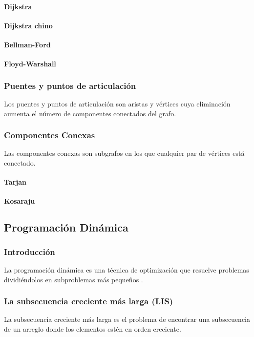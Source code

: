 \paragraph{Dijkstra}
\paragraph{Dijkstra chino}
\paragraph{Bellman-Ford}
\paragraph{Floyd-Warshall}
\subsubsection{Puentes y puntos de articulación}
Los puentes y puntos de articulación son aristas y vértices cuya eliminación aumenta el número de componentes conectados del grafo.
\subsubsection{Componentes Conexas}
Las componentes conexas son subgrafos en los que cualquier par de vértices está conectado.
\paragraph{Tarjan}
\paragraph{Kosaraju}

\subsection{Programación Dinámica}
\subsubsection{Introducción}
La programación dinámica es una técnica de optimización que resuelve problemas dividiéndolos en subproblemas más pequeños \cite{ahmed2020competitive}.
\subsubsection{La subsecuencia creciente más larga (LIS)}
La subsecuencia creciente más larga es el problema de encontrar una subsecuencia de un arreglo donde los elementos estén en orden creciente.
